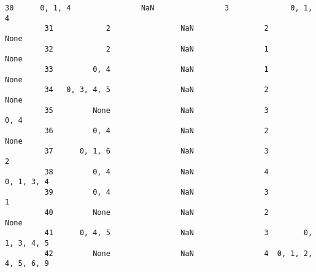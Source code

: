 \documentclass[11pt]{article}
\begin{document}
\begin{Verbatim}[commandchars=\\\{\}]
         30      0, 1, 4                NaN                3              0, 1, 4   
         31            2                NaN                2                 None   
         32            2                NaN                1                 None   
         33         0, 4                NaN                1                 None   
         34   0, 3, 4, 5                NaN                2                 None   
         35         None                NaN                3                 0, 4   
         36         0, 4                NaN                2                 None   
         37      0, 1, 6                NaN                3                    2   
         38         0, 4                NaN                4           0, 1, 3, 4   
         39         0, 4                NaN                3                    1   
         40         None                NaN                2                 None   
         41      0, 4, 5                NaN                3        0, 1, 3, 4, 5   
         42         None                NaN                4  0, 1, 2, 4, 5, 6, 9   
         

\end{Verbatim}
\end{document}
